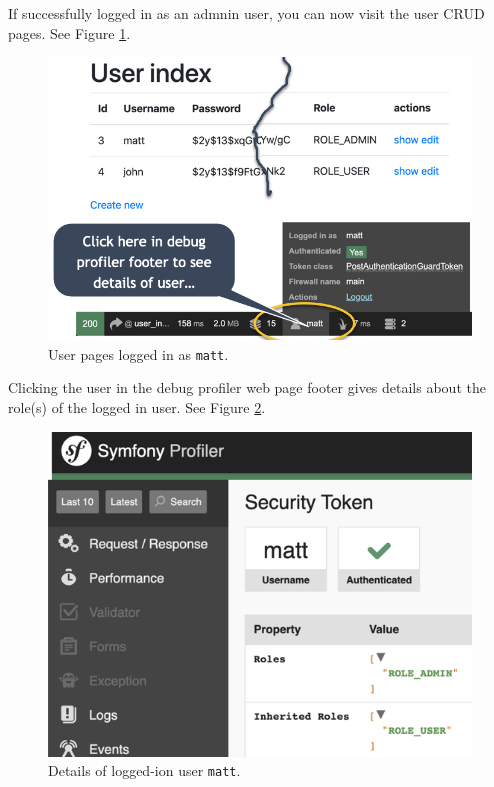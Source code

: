 \documentclass[a4paperpaper,openright]{book}
\begin{document}
If successfully logged in as an admnin user, you can now visit the user
CRUD pages. See Figure \ref{user_matt}.

\begin{figure}
\centering
\includegraphics[width=1\textwidth,height=\textheight]{./tex2pdf.-1b59354caa481da0/84cffeb13f942d54d447415ae700cc1724cc61f3.png}
\caption{User pages logged in as \texttt{matt}. \label{user_matt}}
\end{figure}

Clicking the user in the debug profiler web page footer gives details
about the role(s) of the logged in user. See Figure
\ref{user_matt_details}.

\begin{figure}
\centering
\includegraphics[width=1\textwidth,height=\textheight]{./tex2pdf.-1b59354caa481da0/2983cfab1ceb9b17b7d12ec02312c0bd2617b9da.png}
\caption{Details of logged-ion user \texttt{matt}.
\label{user_matt_details}}
\end{figure}
\end{document}
